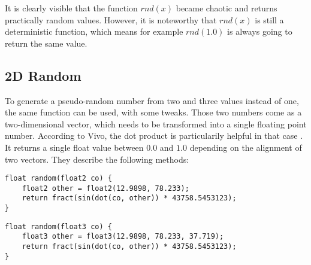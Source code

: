 \begin{figure}[H]
    \centering
\end{figure}

\noindent
It is clearly visible that the function $rnd(x)$ became chaotic and returns practically random values. However, it is noteworthy that $rnd(x)$ is still a deterministic function, which means for example $rnd(1.0)$ is always going to return the same value.

\clearpage
\subsection{2D Random}
To generate a pseudo-random number from two and three values instead of one, the same function can be used, with some tweaks. Those two numbers come as a two-dimensional vector, which needs to be transformed into a single floating point number.
According to Vivo, the dot product is particularily helpful in that case \cite{online:thebookofshaders}. It returns a single float value between $0.0$ and $1.0$ depending on the alignment of two vectors.
They describe the following methods:

\begin{lstlisting}[language=HLSL, caption=Implementation of 2D random number generation., label=lst:random:2d]
float random(float2 co) {
    float2 other = float2(12.9898, 78.233);
    return fract(sin(dot(co, other)) * 43758.5453123);
}
\end{lstlisting}

\begin{lstlisting}[language=HLSL, caption=Implementation of 3D random number generation., label=lst:random:3d]
float random(float3 co) {
    float3 other = float3(12.9898, 78.233, 37.719);
    return fract(sin(dot(co, other)) * 43758.5453123);
}
\end{lstlisting}

